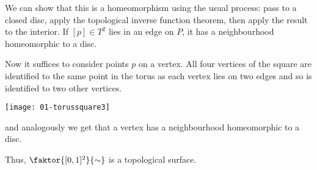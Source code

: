 \begin{example}
	We can show that this is a homeomorphism using the usual process: pass to a closed disc, apply the topological inverse function theorem, then apply the result to the interior.
	If $[p] \in T^2$ lies in an edge on $P$, it has a neighbourhood homeomorphic to a disc.

	Now it suffices to consider points $p$ on a vertex.
	All four vertices of the square are identified to the same point in the torus as each vertex lies on two edges and so is identified to two other vertices.
	{ 	
		\par
		\centering 
		\texttt{[image: 01-torussquare3]} 
		\par
	}
	and analogously we get that a vertex has a neighbourhood homeomorphic to a disc.

	Thus, $\faktor{[0,1]^2}{\sim}$ is a topological surface.
\end{example}

